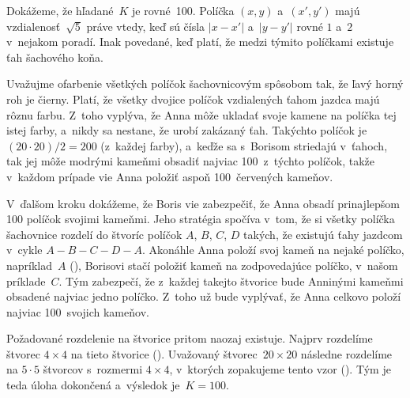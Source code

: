 {%
Dokážeme, že hľadané~$K$ je rovné~100. Políčka $(x,y)$ a~$(x',y')$ majú vzdialenosť~$\sqrt5$ práve vtedy, keď sú čísla $|x-x'|$ a~$|y-y'|$ rovné $1$ a~$2$ v~nejakom poradí. Inak povedané, keď platí, že medzi týmito políčkami existuje ťah šachového koňa.

Uvažujme ofarbenie všetkých políčok šachovnicovým spôsobom tak, že ľavý horný roh je čierny. Platí, že všetky dvojice políčok vzdialených ťahom jazdca majú rôznu farbu. Z~toho vyplýva, že Anna môže ukladať svoje kamene na políčka tej istej farby, a~nikdy sa nestane, že urobí zakázaný ťah. Takýchto políčok je~$(20 \cdot 20)/2 = 200$ (z~každej farby), a~keďže sa s~Borisom striedajú v~ťahoch, tak jej môže modrými kameňmi obsadiť najviac 100~z~týchto políčok, takže v~každom prípade vie Anna položiť aspoň 100~červených kameňov.
%

V~ďalšom kroku dokážeme, že Boris vie zabezpečiť, že Anna obsadí prinajlepšom 100 políčok svojimi kameňmi. Jeho stratégia spočíva v~tom, že si všetky políčka šachovnice rozdelí do štvoríc políčok $A$, $B$, $C$, $D$ takých, že existujú ťahy jazdcom v~cykle $A{-}B{-}C{-}D{-}A$. Akonáhle Anna položí svoj kameň na nejaké políčko, napríklad~$A$ (\obr), Borisovi stačí položiť kameň na zodpovedajúce  políčko, v~našom príklade~$C$. Tým zabezpečí, že z~každej takejto štvorice bude Anninými kameňmi obsadené najviac jedno políčko. Z~toho už bude vyplývať, že Anna celkovo položí najviac 100~svojich kameňov.

Požadované rozdelenie na štvorice pritom naozaj existuje. Najprv rozdelíme štvorec $4 \times 4$ na tieto štvorice (\obr). Uvažovaný štvorec~$20 \times 20$ následne rozdelíme na $5 \cdot 5$ štvorcov s~rozmermi $4 \times 4$, v~ktorých zopakujeme tento vzor (\obr). Tým je teda úloha dokončená a~výsledok je~$K=100$.}

